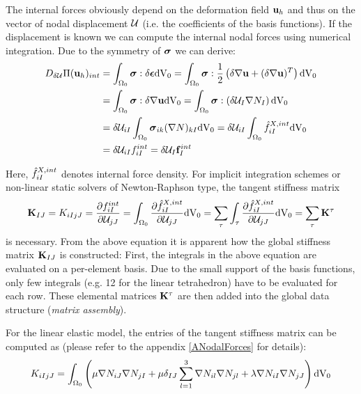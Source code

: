 The internal forces obviously depend on the deformation field $\mathbf {u} _h$ and thus on the vector of nodal displacement $\mathcal{U} $ (i.e. the coefficients of the basis functions). If the displacement is known we can compute the internal nodal forces using numerical integration. Due to the symmetry of $\boldsymbol{\sigma}$ we can derive:
\begin{alignat}{1}
D_{\delta \mathcal{U} } \Pi (\mathbf {u}  _h) _{int} &= \int _{\Omega _0}  \boldsymbol{\sigma} : \delta \boldsymbol{\epsilon}   \textnormal{dV}_0 =  \int _{\Omega _0}  \boldsymbol{\sigma} : \frac{1}{2} \left( \delta \nabla \mathbf {u}  + (\delta \nabla \mathbf {u} )^T \right)   \textnormal{dV}_0 \\
&=  \int _{\Omega _0}  \boldsymbol{\sigma} :  \delta \nabla \mathbf {u}    \textnormal{dV}_0 = \int _{\Omega _0}  \boldsymbol{\sigma} : \left( \delta \mathcal{U} _I \nabla N_I  \right)  \textnormal{dV}_0 \\
&= \delta \mathcal{U} _{iI} \int _{\Omega _0}  \boldsymbol{\sigma}_{ik}  (\nabla N)_{kI}  \textnormal{dV}_0 = \delta \mathcal{U} _{iI} \int _{\Omega _0}   \hat{f} ^{X,int}_{iI}   \textnormal{dV}_0\\
&= \delta \mathcal{U} _{iI} f ^{int}_{iI}  = \delta \mathcal{U} _I \mathbf f ^{int}_I 
\label{fint}
\end{alignat}

Here, $\hat{f} ^{X,int}_{iI} $ denotes internal force density. For implicit integration schemes or non-linear static solvers of Newton-Raphson type, the tangent stiffness matrix 
\begin{alignat}{1}
\mathbf K _{IJ} = K _{iIjJ} = \frac{\partial f ^{int}_{iI} }{\partial \mathcal{U} _{jJ}} = \int _{\Omega _0}  \frac{\partial \hat{f} ^{X,int}_{iI} }{\partial \mathcal{U} _{jJ}}  \textnormal{dV}_0 = \sum_{\tau} \int _{\tau}  \frac{\partial \hat{f} ^{X,int}_{iI} }{\partial \mathcal{U} _{jJ}}  \textnormal{dV}_0 = \sum_{\tau} \mathbf{K}^{\tau}
\label{StiffnessMat}
\end{alignat}
is necessary. From the above equation it is apparent how the global stiffness matrix $\mathbf K _{IJ}$ is constructed: First, the integrals in the above equation are evaluated on a per-element basis. Due to the small support of the basis functions, only few integrals (e.g. 12 for the linear tetrahedron) have to be evaluated for each row. These elemental matrices $\mathbf{K}^{\tau}$ are then added into the global data structure (\emph{matrix assembly}).

For the linear elastic model, the entries of the tangent stiffness matrix can be computed as (please refer to the appendix \ref{ANodalForces} for details):
\begin{alignat}{1}
K _{iIjJ} = \int _{\Omega _0}  \left( \mu \nabla N _{iJ} \nabla N _{jI} + \mu \delta_{IJ} \sum_{l=1} ^3 \nabla N _{il} \nabla N _{jl} +\lambda \nabla N _{iI} \nabla N _{jJ}  \right) \textnormal{dV}_0
\end{alignat}

